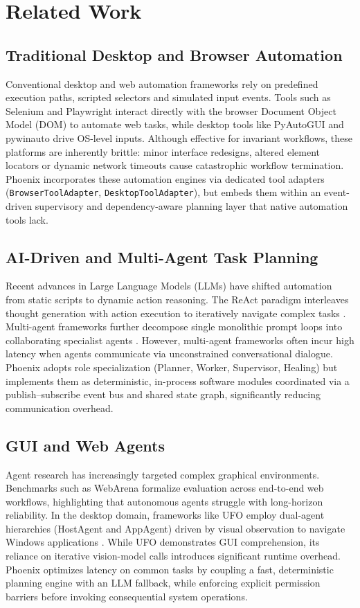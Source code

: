 \documentclass[conference]{IEEEtran}
\begin{document}
\section{Related Work}
\subsection{Traditional Desktop and Browser Automation}
Conventional desktop and web automation frameworks rely on predefined execution paths, scripted selectors and simulated input events. Tools such as Selenium \cite{garcia2026} and Playwright interact directly with the browser Document Object Model (DOM) to automate web tasks, while desktop tools like PyAutoGUI and pywinauto drive OS-level inputs. Although effective for invariant workflows, these platforms are inherently brittle: minor interface redesigns, altered element locators or dynamic network timeouts cause catastrophic workflow termination. Phoenix incorporates these automation engines via dedicated tool adapters (\texttt{BrowserToolAdapter}, \texttt{DesktopToolAdapter}), but embeds them within an event-driven supervisory and dependency-aware planning layer that native automation tools lack.

\subsection{AI-Driven and Multi-Agent Task Planning}
Recent advances in Large Language Models (LLMs) have shifted automation from static scripts to dynamic action reasoning. The ReAct paradigm interleaves thought generation with action execution to iteratively navigate complex tasks \cite{bajoria2026}. Multi-agent frameworks further decompose single monolithic prompt loops into collaborating specialist agents \cite{guo2026, patel2026isiber, bajoria2026}. However, multi-agent frameworks often incur high latency when agents communicate via unconstrained conversational dialogue. Phoenix adopts role specialization (Planner, Worker, Supervisor, Healing) but implements them as deterministic, in-process software modules coordinated via a publish--subscribe event bus and shared state graph, significantly reducing communication overhead.

\subsection{GUI and Web Agents}
Agent research has increasingly targeted complex graphical environments. Benchmarks such as WebArena \cite{nguyen2025} formalize evaluation across end-to-end web workflows, highlighting that autonomous agents struggle with long-horizon reliability. In the desktop domain, frameworks like UFO employ dual-agent hierarchies (HostAgent and AppAgent) driven by visual observation to navigate Windows applications \cite{nguyen2025}. While UFO demonstrates GUI comprehension, its reliance on iterative vision-model calls introduces significant runtime overhead. Phoenix optimizes latency on common tasks by coupling a fast, deterministic planning engine with an LLM fallback, while enforcing explicit permission barriers before invoking consequential system operations.
\end{document}
